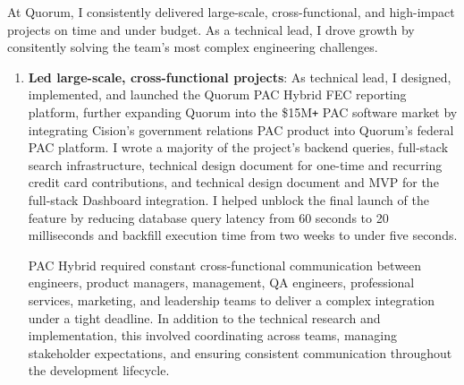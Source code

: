 \documentclass[]{article}
\def\Plus{\texttt{+}}
\begin{document}
At Quorum, I consistently delivered large-scale, cross-functional, and high-impact projects on time and under budget. As a technical lead, I drove growth by consitently solving the team's most complex engineering challenges.


\begin{enumerate}
	\item \textbf{Led large-scale, cross-functional projects}: As technical lead, I designed, implemented, and launched the Quorum PAC Hybrid FEC reporting platform, further expanding Quorum into the \$15M{\Plus} PAC software market by integrating Cision’s government relations PAC product into Quorum’s federal PAC platform. I wrote a majority of the project's backend queries, full-stack search infrastructure, technical design document for one-time and recurring credit card contributions, and technical design document and MVP for the full-stack Dashboard integration. I helped unblock the final launch of the feature by reducing database query latency from 60 seconds to 20 milliseconds and backfill execution time from two weeks to under five seconds.

	PAC Hybrid required constant cross-functional communication between engineers, product managers, management, QA engineers, professional services, marketing, and leadership teams to deliver a complex integration under a tight deadline. In addition to the technical research and implementation, this involved coordinating across teams, managing stakeholder expectations, and ensuring consistent communication throughout the development lifecycle.



\end{enumerate}
\end{document}
